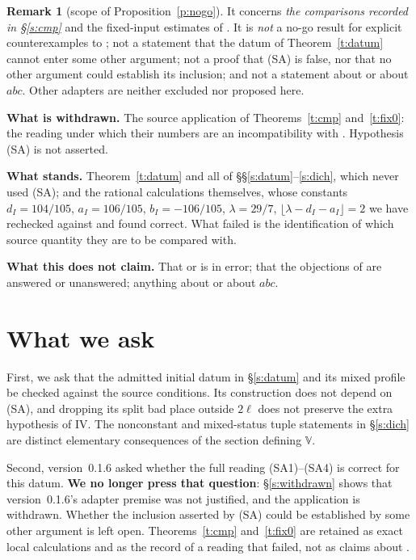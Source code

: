 \documentclass[11pt]{article}
\theoremstyle{plain}
\theoremstyle{definition}
\newtheorem{remark}{Remark}
\newcommand{\VV}{\mathbb{V}}
\newcommand{\SA}{\textup{(SA)}}
\begin{document}
\begin{remark}[scope of Proposition~\ref{p:nogo}]
It concerns \emph{the comparisons recorded in \S\ref{s:cmp}} and the fixed-input
estimates of \cite[Prop.~1.2, Prop.~1.4]{IUT4}.  It is \emph{not} a no-go result
for explicit counterexamples to \cite{IUT1,IUT2,IUT3,IUT4}; not a statement that
the datum of Theorem~\ref{t:datum} cannot enter some other argument; not a proof
that \SA{} is false, nor that no other argument could establish its inclusion;
and not a statement about \cite[Cor.~3.12]{IUT3} or about $abc$.  Other adapters
are neither excluded nor proposed here.
\end{remark}

\noindent\textbf{What is withdrawn.}  The source application of
Theorems~\ref{t:cmp} and~\ref{t:fix0}: the reading under which their numbers are
an incompatibility with \cite{IUT4}.  Hypothesis \SA{} is not asserted.

\noindent\textbf{What stands.}  Theorem~\ref{t:datum} and all of
\S\S\ref{s:datum}--\ref{s:dich}, which never used \SA{}; and the rational
calculations themselves, whose constants
$d_I=104/105$, $a_I=106/105$, $b_I=-106/105$, $\lambda=29/7$,
$\lfloor\lambda-d_I-a_I\rfloor=2$ we have rechecked against
\cite[Prop.~1.1, Prop.~1.2, Prop.~1.4]{IUT4} and found correct.  What failed is
the identification of which source quantity they are to be compared with.

\noindent\textbf{What this does not claim.}  That \cite[Prop.~1.2]{IUT4} or
\cite[Prop.~1.4]{IUT4} is in error; that the objections of \cite{SS} are
answered or unanswered; anything about \cite[Cor.~3.12]{IUT3} or about $abc$.

\section{What we ask}\label{s:ask}

First, we ask that the admitted initial datum in \S\ref{s:datum} and its
mixed profile be checked against the source conditions.  Its construction
does not depend on \SA{}, and dropping its split bad place outside $2\ell$
does not preserve the extra hypothesis of IV.  The nonconstant and
mixed-status tuple statements in \S\ref{s:dich} are distinct elementary
consequences of the section defining $\VV$.

Second, version~0.1.6 asked whether the full reading (SA1)--(SA4) is correct for
this datum.  \textbf{We no longer press that question}: \S\ref{s:withdrawn} shows that
version~0.1.6's adapter premise was not justified, and the application is
withdrawn.  Whether the inclusion asserted by \SA{} could be established by some
other argument is left open.  Theorems~\ref{t:cmp} and~\ref{t:fix0} are retained as
exact local calculations and as the record of a reading that failed, not as
claims about \cite{IUT4}.
\end{document}
